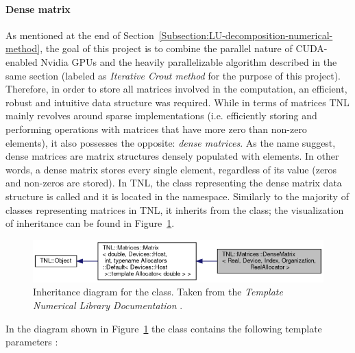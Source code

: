 \paragraph{Dense matrix}\label{Paragraph:implementation-tnl-library-dense-matrix}
As mentioned at the end of Section~\ref{Subsection:LU-decomposition-numerical-method}, the goal of this project is to combine the parallel nature of CUDA-enabled Nvidia GPUs and the heavily parallelizable algorithm described in the same section (labeled as \textit{Iterative Crout method} for the purpose of this project). \\
Therefore, in order to store all matrices involved in the computation, an efficient, robust and intuitive data structure was required. While in terms of matrices TNL mainly revolves around sparse implementations (i.e. efficiently storing and performing operations with matrices that have more zero than non-zero elements), it also possesses the opposite: \textit{dense matrices}. As the name suggest, dense matrices are matrix structures densely populated with elements. In other words, a dense matrix stores every single element, regardless of its value (zeros and non-zeros are stored). In TNL, the class representing the dense matrix data structure is called  and it is located in the  namespace. Similarly to the majority of classes representing matrices in TNL, it inherits from the  class; the visualization of inheritance can be found in Figure~\ref{Figure:implementation-tnl-library-dense-matrix}.

\begin{figure}[h!]
	\centering
	\includegraphics[width=\textwidth, keepaspectratio]{images/ch2/tnl_matrices_dense_matrix-inheritance.png}
	\caption{Inheritance diagram for the  class. Taken from the \emph{Template Numerical Library Documentation} \cite{Ednu6dyrkWKz1Bv2}.}
	\label{Figure:implementation-tnl-library-dense-matrix}
\end{figure}

In the diagram shown in Figure~\ref{Figure:implementation-tnl-library-dense-matrix} the  class contains the following template parameters \cite{Ednu6dyrkWKz1Bv2}:

